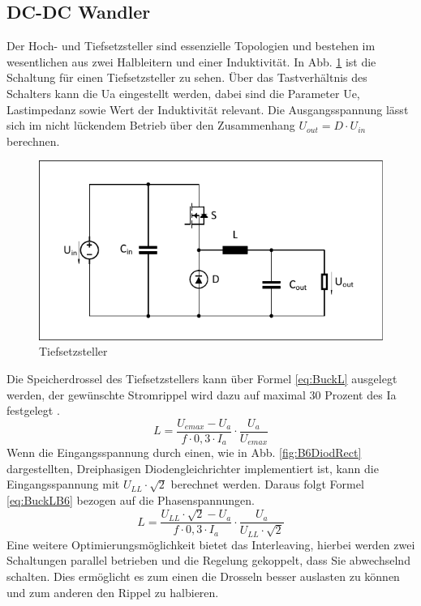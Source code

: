 		\subsection{DC-DC Wandler}
		Der Hoch- und Tiefsetzsteller sind essenzielle Topologien und bestehen im wesentlichen aus zwei Halbleitern und einer Induktivität. In Abb. \ref{fig:buck} ist die Schaltung für einen Tiefsetzsteller zu sehen. Über das Tastverhältnis des Schalters kann die \gls{Ua} eingestellt werden, dabei sind die Parameter \gls{Ue}, Lastimpedanz sowie Wert der Induktivität relevant. Die Ausgangsspannung lässt sich im nicht lückendem Betrieb über den Zusammenhang $U_{out}=D\cdot U_{in} $ berechnen.\\
		\begin{figure}
			\centering
			\includegraphics[width=0.7\linewidth]{content/Grafiken/Buck}
			\caption[Tiefsetzsteller]{Tiefsetzsteller}
			\label{fig:buck}
		\end{figure}
		Die Speicherdrossel des Tiefsetzstellers kann über Formel \ref{eq:BuckL} ausgelegt werden, der gewünschte Stromrippel wird dazu auf maximal 30 Prozent des \gls{Ia} festgelegt \cite{schmidtwalter}.
		\begin{equation}
			\label{eq:BuckL}
			L=\dfrac{U_{emax}-U_{a}}{f\cdot 0,3 \cdot I_{a}}\cdot \dfrac{U_{a}}{U_{emax}}
		\end{equation}
		Wenn die Eingangsspannung durch einen, wie in Abb. \ref{fig:B6DiodRect} dargestellten, Dreiphasigen Diodengleichrichter implementiert ist, kann die Eingangsspannung mit $U_{LL} \cdot \sqrt{2}$ berechnet werden. Daraus folgt Formel \ref{eq:BuckLB6} bezogen auf die Phasenspannungen. \\
		\begin{equation}
			\label{eq:BuckLB6}
			L=\dfrac{U_{LL} \cdot \sqrt{2}-U_{a}}{f\cdot 0,3 \cdot I_{a}}\cdot \dfrac{U_{a}}{U_{LL} \cdot \sqrt{2}}
		\end{equation}
		Eine weitere Optimierungsmöglichkeit bietet das Interleaving, hierbei werden zwei Schaltungen parallel betrieben und die Regelung gekoppelt, dass Sie abwechselnd schalten. Dies ermöglicht es zum einen die Drosseln besser auslasten zu können und zum anderen den Rippel zu halbieren. 
		

